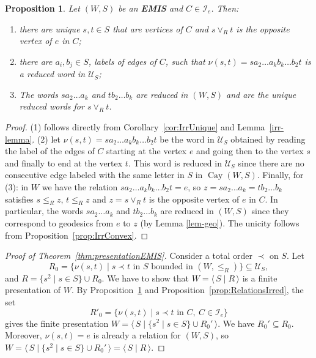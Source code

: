 \documentclass[A4paper, oneside]{amsart}
\newcommand{\id}{\textit{e}}
\newcommand{\mpair}[1]{\langle\, #1\,\rangle}  %
\newcommand{\Cay}{\operatorname{Cay}}
\newcommand{\Irr}{\mathcal{I}}
\newcommand{\U}{\mathcal{U}}
\newcommand{\EMIS}{\textnormal{\bf EMIS}\xspace}
\newtheorem{prop}[thm]{Proposition}
\theoremstyle{definition}
\begin{document}
\begin{prop}\label{prop:EMISJoin} Let $(W,S)$ be an \EMIS and $C\in \Irr_e$. Then:
\begin{enumerate}
\item there are unique $s,t\in S$ that are vertices of $C$ and $s\vee_R t$ is the opposite vertex of $\id$ in $C$;

\item  there are $a_i,b_j\in S$, labels of edges of $C$, such that $\nu(s,t)=sa_2\dots a_kb_k\dots b_2t$ is a reduced word in $\U_S$;

\item The words $sa_2\dots a_k$ and $tb_2\dots b_k$ are reduced in $(W,S)$ and are the unique reduced words for $s\vee_R t$.
\end{enumerate}
\end{prop}
\begin{proof} (1) follows directly from Corollary~\ref{cor:IrrUnique} and Lemma~\ref{irr-lemma}. (2) let $\nu(s,t)=sa_2\dots a_kb_k\dots b_2t$ be the word in $\U_S$ obtained by reading the label of the edges of $C$ starting at the vertex $\id$ and going then to the vertex $s$ and finally to end at the vertex $t$. This word is reduced in $\U_S$ since there are no consecutive edge labeled with the same letter in $S$ in $\Cay(W,S)$. Finally, for (3): in $W$ we have the relation $sa_2\dots a_kb_k\dots b_2t=\id$, so $z= sa_2\dots a_k=tb_2\dots b_k$ satisfies $s\leq_R z$, $t\leq_R z$ and $z=s\vee_R t$ is the opposite vertex of $\id$ in $C$. In particular, the words $sa_2\dots a_k$ and $tb_2\dots b_k$ are reduced in $(W,S)$ since they correspond to geodesics from $\id$ to $z$ (by Lemma \ref{lem-geo}).  The unicity follows from Proposition~\ref{prop:IrrConvex}.
\end{proof}

\begin{proof}[{Proof of Theorem~\ref{thm:presentationEMIS}}]  Consider a total order $\prec$ on $S$. Let 
$$
R_0=\big\{\nu(s,t)\mid s\prec t \textrm{ in $S$ bounded in }(W,\leq_R)\big\}\subseteq \U_S,
$$
and $R=\{s^2 \mid s\in S\}\cup R_0$.  We have to show that $W=\mpair{S\mid R}$ is a finite presentation of $W$. By Proposition~\ref{prop:EMISJoin} and Proposition~\ref{prop:RelationsIrred}, the set
$$
R'_0=\big\{\nu(s,t)\mid s\prec t \textrm{ in $C$},\ C\in\Irr_\id\big\}
$$
gives the finite presentation $W=\mpair{S\mid \{s^2 \mid s\in S\} \cup R_0'}$. 
We have $R_0'\subseteq R_0$. Moreover, $\nu(s,t)=\id$ is already a relation for $(W,S)$, so 
$W=\mpair{S\mid \{s^2 \mid s\in S\} \cup R_0'}=\mpair{S\mid R}$.
\end{proof}
\end{document}
